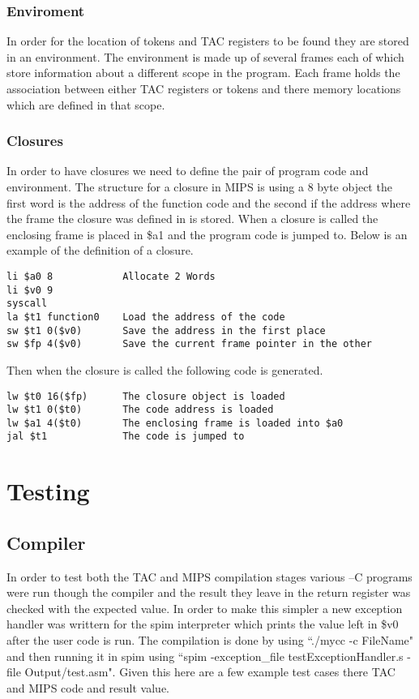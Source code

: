 \documentclass{article}
\begin{document}
\subsubsection{Enviroment}
In order for the location of tokens and TAC registers to be found they are stored
in an environment. The environment is made up of several frames each of which store
information about a different scope in the program. Each frame holds the association
between either TAC registers or tokens and there memory locations which are defined
in that scope.

\subsubsection{Closures}

In order to have closures we need to define the pair of program code and environment.
The structure for a closure in MIPS is using a 8 byte object the first word is
the address of the function code and the second if the address where the frame
the closure was defined in is stored. When a closure is called the enclosing frame is
placed in \$a1 and the program code is jumped to. Below is an example of the definition
of a closure.

\begin{lstlisting}
li $a0 8            Allocate 2 Words
li $v0 9
syscall
la $t1 function0    Load the address of the code
sw $t1 0($v0)       Save the address in the first place
sw $fp 4($v0)       Save the current frame pointer in the other
\end{lstlisting}

Then when the closure is called the following code is generated.

\begin{lstlisting}
lw $t0 16($fp)      The closure object is loaded
lw $t1 0($t0)       The code address is loaded
lw $a1 4($t0)       The enclosing frame is loaded into $a0
jal $t1             The code is jumped to
\end{lstlisting}

\section{Testing}

\subsection{Compiler}
In order to test both the TAC and MIPS compilation stages various --C programs
were run though the compiler and the result they leave in the return register
was checked with the expected value. In order to make this simpler a new
exception handler was writtern for the spim interpreter which prints the value
left in \$v0 after the user code is run. The compilation is done by using
``./mycc -c FileName" and then running it in spim using ``spim -exception\_file testExceptionHandler.s -file Output/test.asm".
Given this here are a few example test cases there TAC and MIPS code and result
value.
\end{document}

